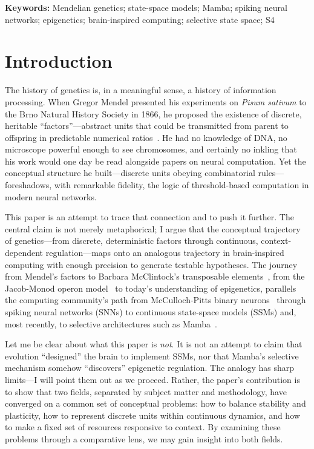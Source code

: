 \documentclass[12pt,a4paper]{article}
\begin{document}
\noindent\textbf{Keywords:} Mendelian genetics; state-space models; Mamba; spiking neural networks; epigenetics; brain-inspired computing; selective state space; S4

\section{Introduction}
\label{sec:intro}

The history of genetics is, in a meaningful sense, a history of information processing. When Gregor Mendel presented his experiments on \emph{Pisum sativum} to the Brno Natural History Society in 1866, he proposed the existence of discrete, heritable ``factors''---abstract units that could be transmitted from parent to offspring in predictable numerical ratios~\cite{mendel1866}. He had no knowledge of DNA, no microscope powerful enough to see chromosomes, and certainly no inkling that his work would one day be read alongside papers on neural computation. Yet the conceptual structure he built---discrete units obeying combinatorial rules---foreshadows, with remarkable fidelity, the logic of threshold-based computation in modern neural networks.

This paper is an attempt to trace that connection and to push it further. The central claim is not merely metaphorical; I argue that the conceptual trajectory of genetics---from discrete, deterministic factors through continuous, context-dependent regulation---maps onto an analogous trajectory in brain-inspired computing with enough precision to generate testable hypotheses. The journey from Mendel's factors to Barbara McClintock's transposable elements~\cite{mcclintock1950}, from the Jacob-Monod operon model~\cite{jacob1961} to today's understanding of epigenetics, parallels the computing community's path from McCulloch-Pitts binary neurons~\cite{mcculloch1943} through spiking neural networks (SNNs) to continuous state-space models (SSMs) and, most recently, to selective architectures such as Mamba~\cite{gu2023mamba}.

Let me be clear about what this paper is \emph{not}. It is not an attempt to claim that evolution ``designed'' the brain to implement SSMs, nor that Mamba's selective mechanism somehow ``discovers'' epigenetic regulation. The analogy has sharp limits---I will point them out as we proceed. Rather, the paper's contribution is to show that two fields, separated by subject matter and methodology, have converged on a common set of conceptual problems: how to balance stability and plasticity, how to represent discrete units within continuous dynamics, and how to make a fixed set of resources responsive to context. By examining these problems through a comparative lens, we may gain insight into both fields.
\end{document}
